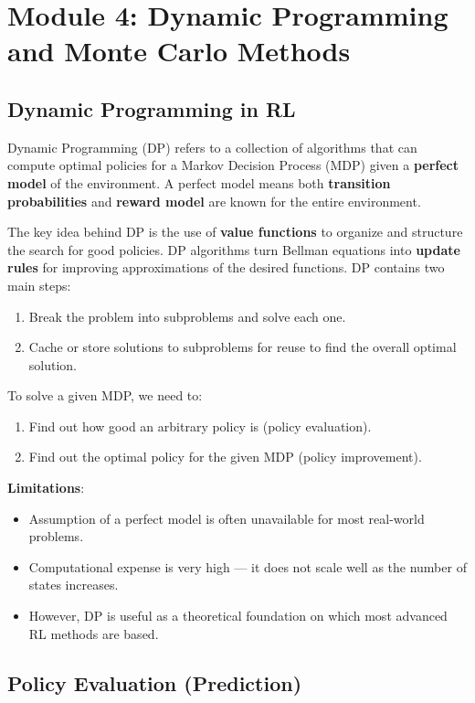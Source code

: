 \documentclass[11pt,a4paper]{article}
\begin{document}
\section{Module 4: Dynamic Programming and Monte Carlo Methods}

\subsection{Dynamic Programming in RL}

Dynamic Programming (DP) refers to a collection of algorithms that can compute optimal policies for a Markov Decision Process (MDP) given a \textbf{perfect model} of the environment. A perfect model means both \textbf{transition probabilities} and \textbf{reward model} are known for the entire environment.

The key idea behind DP is the use of \textbf{value functions} to organize and structure the search for good policies. DP algorithms turn Bellman equations into \textbf{update rules} for improving approximations of the desired functions. DP contains two main steps:
\begin{enumerate}
    \item Break the problem into subproblems and solve each one.
    \item Cache or store solutions to subproblems for reuse to find the overall optimal solution.
\end{enumerate}

To solve a given MDP, we need to:
\begin{enumerate}
    \item Find out how good an arbitrary policy is (policy evaluation).
    \item Find out the optimal policy for the given MDP (policy improvement).
\end{enumerate}

\textbf{Limitations}:
\begin{itemize}
    \item Assumption of a perfect model is often unavailable for most real-world problems.
    \item Computational expense is very high --- it does not scale well as the number of states increases.
    \item However, DP is useful as a theoretical foundation on which most advanced RL methods are based.
\end{itemize}

\subsection{Policy Evaluation (Prediction)}
\end{document}
